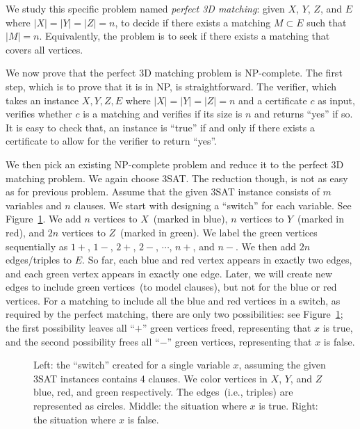 We study this specific problem named \emph{perfect 3D matching}:
given $X$, $Y$, $Z$, and $E$ where $|X|=|Y|=|Z|=n$, to decide
if there exists a matching $M\subset E$ such that $|M| = n$.
Equivalently, the problem is to seek if there exists a matching that covers
all vertices.

We now prove that the perfect 3D matching problem is NP-complete.
The first step, which is to prove that it is in NP, is straightforward.
The verifier, which takes an instance $X,Y,Z,E$ where $|X|=|Y|=|Z|=n$ and a certificate
$c$ as input, verifies whether $c$ is a matching and verifies
if its size is $n$ and returns ``yes'' if so. It is easy to check that, an instance is ``true''
if and only if there exists a certificate to allow for the verifier to return ``yes''.

We then pick an existing NP-complete problem and reduce it to the perfect 3D matching problem.
We again choose 3SAT. The reduction though, is not as easy as for previous problem.
Assume that the given 3SAT instance consists of $m$ variables and $n$ clauses.
We start with designing a ``switch'' for each variable. See Figure~\ref{fig:3dvar}.
We add $n$ vertices to $X$~(marked in blue), $n$ vertices to $Y$~(marked in red), and $2n$ vertices to $Z$~(marked in green).
We label the green vertices sequentially as $1+$, $1-$, $2+$, $2-$, $\cdots$, $n+$, and $n-$.
We then add $2n$ edges/triples to $E$. 
So far, each blue and red vertex appears in exactly two edges, and
each green vertex appears in exactly one edge.
Later, we will create new edges to include green vertices~(to model clauses),
but not for the blue or red vertices. 
For a matching to include all the blue and red vertices in a switch, as required by the perfect matching,
there are only two possibilities: see Figure~\ref{fig:3dvar};
the first possibility leaves all ``$+$'' green vertices freed, representing that $x$ is true,
	and the second possibility frees all ``$-$'' green vertices, representing that $x$ is false.

\begin{figure}[!h]
\centering{}
\caption{Left: the ``switch'' created for a single variable $x$, assuming the
given 3SAT instances contains 4 clauses. We color vertices
in $X$, $Y$, and $Z$ blue, red, and green respectively. The edges~(i.e., triples)
are represented as circles. Middle: the situation where $x$ is true.
Right: the situation where $x$ is false.}
\label{fig:3dvar}
\end{figure}

